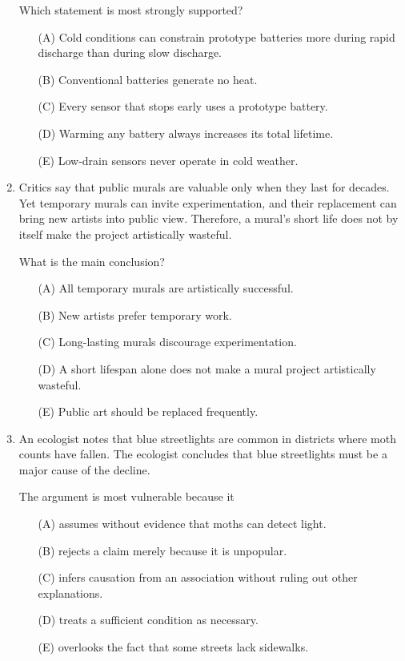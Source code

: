 \begin{enumerate}
Which statement is most strongly supported?
\begin{enumerate}
\item[(A)] Cold conditions can constrain prototype batteries more during rapid discharge than during slow discharge.
\item[(B)] Conventional batteries generate no heat.
\item[(C)] Every sensor that stops early uses a prototype battery.
\item[(D)] Warming any battery always increases its total lifetime.
\item[(E)] Low-drain sensors never operate in cold weather.
\end{enumerate}

\item Critics say that public murals are valuable only when they last for decades. Yet temporary murals can invite experimentation, and their replacement can bring new artists into public view. Therefore, a mural's short life does not by itself make the project artistically wasteful.

What is the main conclusion?
\begin{enumerate}
\item[(A)] All temporary murals are artistically successful.
\item[(B)] New artists prefer temporary work.
\item[(C)] Long-lasting murals discourage experimentation.
\item[(D)] A short lifespan alone does not make a mural project artistically wasteful.
\item[(E)] Public art should be replaced frequently.
\end{enumerate}

\item An ecologist notes that blue streetlights are common in districts where moth counts have fallen. The ecologist concludes that blue streetlights must be a major cause of the decline.

The argument is most vulnerable because it
\begin{enumerate}
\item[(A)] assumes without evidence that moths can detect light.
\item[(B)] rejects a claim merely because it is unpopular.
\item[(C)] infers causation from an association without ruling out other explanations.
\item[(D)] treats a sufficient condition as necessary.
\item[(E)] overlooks the fact that some streets lack sidewalks.
\end{enumerate}


\end{enumerate}

